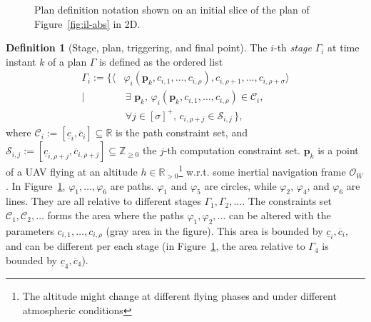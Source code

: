 \documentclass[letterpaper,10pt,conference]{ieeeconf}
\newcommand{\figpath}{./figures}
\theoremstyle{definition}
\newtheorem{defn}{Definition}[section]
\begin{document}
\begin{figure}[h]
  \centering
  
  \caption{Plan definition notation shown on an initial slice of the plan of Figure~\ref{fig:il-abs} in 2D.}
  \label{fig:traj1}
\end{figure}

\begin{defn}[Stage, plan, triggering, and final point]\label{def:mission}
  The $i$-th \emph{stage} $\Gamma_i$ at time instant $k$ of a plan $\Gamma$ is defined as the ordered list
  \begin{equation*}\begin{split}
    \Gamma_i:=\{\langle&\varphi_i(\mathbf{p}_k,c_{i,1},\dots,c_{i,\rho}),c_{i,\rho+1},\dots,c_{i,\rho+\sigma}\rangle\\\mid
    &\,\exists\,\,\mathbf{p}_k,\,\varphi_i(\mathbf{p}_k,c_{i,1},\dots,c_{i,\rho})\in\mathcal{C}_i,\,\\
      &\,\forall j\in[\sigma]^+,\,c_{i,\rho+j}\in\mathcal{S}_{i,j}\,\},
  \end{split}\end{equation*}
  where $\mathcal{C}_i:=[\underline{c}_i,\overline{c}_i]\subseteq\mathbb{R}$ is the path constraint set, and $\mathcal{S}_{i,j}:=[\underline{c}_{i,\rho+j},\overline{c}_{i,\rho+j}]\subseteq\mathbb{Z}_{\geq 0}$ the $j$-th computation constraint set. $\mathbf{p}_k$ is a point of a UAV flying at an altitude $h\in\mathbb{R}_{>0}$\footnote{The altitude might change at different flying phases and under different atmospheric conditions} w.r.t. some inertial navigation frame $\mathcal{O}_W$. In Figure~\ref{fig:traj1}, $\varphi_1,\dots,\varphi_6$ are paths. $\varphi_1$ and $\varphi_5$ are circles, while $\varphi_2$, $\varphi_4$, and $\varphi_6$ are lines. They are all relative to different stages $\Gamma_1,\Gamma_2,\dots$. The constraints set $\mathcal{C}_1,\mathcal{C}_2,\dots$ forms the area where the paths $\varphi_1,\varphi_2,\dots$ can be altered with the parameters $c_{i,1},\dots,c_{i,\rho}$ (gray area in the figure). This area is bounded by $\underline{c}_i,\overline{c}_i$, and can be different per each stage (in Figure~\ref{fig:traj1}, the area relative to $\Gamma_4$ is bounded by $\underline{c}_4,\overline{c}_4$).


\end{defn}
\end{document}
